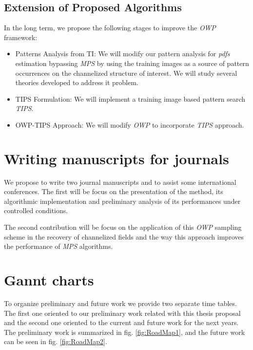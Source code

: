\subsection{Extension of Proposed Algorithms} 

In the long term, we propose the following stages to improve the \emph{OWP} framework:
	\begin{itemize}
		\item {Patterns Analysis from TI:} We will modify our pattern analysis for \emph{pdfs} estimation bypassing \emph{MPS} by using the training images as a source of pattern occurrences on the channelized structure of interest. We will study several theories developed to address it problem.
		\item {TIPS Formulation:}  We will implement a training image based pattern search \emph{TIPS}.
		\item {OWP-TIPS Approach:} We will modify \emph{OWP} to incorporate \emph{TIPS} approach.
	\end{itemize}





















\section{Writing manuscripts for journals}

We propose to write two journal manuscripts and to assist some international conferences. The first will be focus on the presentation of the method, its algorithmic implementation and preliminary analysis of its performances under controlled conditions.

The second contribution will be focus on the application of this \emph{OWP} sampling scheme in the recovery of channelized fields and the way this approach improves the performance of \emph{MPS} algorithms.

\section{Gannt charts}


To organize preliminary and future work we provide two separate time tables. The first one oriented to our preliminary work related with this thesis proposal and the second one oriented to the current and future work for the next years. The preliminary work is summarized in fig. \ref{fig:RoadMap1}, and the future work can be seen in fig. \ref{fig:RoadMap2}.


